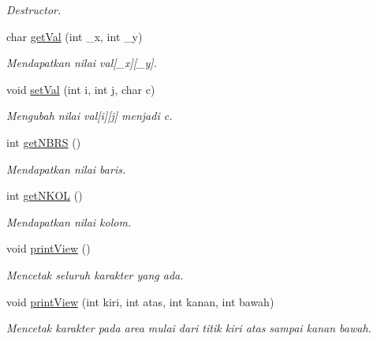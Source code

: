 \begin{DoxyCompactItemize}
\begin{DoxyCompactList}\small\item\em Destructor. \end{DoxyCompactList}\item 
char \hyperlink{classView_aa6bd990eaac4d2991f27b304213b54ef}{get\-Val} (int \-\_\-x, int \-\_\-y)
\begin{DoxyCompactList}\small\item\em Mendapatkan nilai val\mbox{[}\-\_\-x\mbox{]}\mbox{[}\-\_\-y\mbox{]}. \end{DoxyCompactList}\item 
void \hyperlink{classView_a21cba84b1b3374baaec030a21128db47}{set\-Val} (int i, int j, char c)
\begin{DoxyCompactList}\small\item\em Mengubah nilai val\mbox{[}i\mbox{]}\mbox{[}j\mbox{]} menjadi c. \end{DoxyCompactList}\item 
int \hyperlink{classView_a62ae4de313b6643810b989ae988a1640}{get\-N\-B\-R\-S} ()
\begin{DoxyCompactList}\small\item\em Mendapatkan nilai baris. \end{DoxyCompactList}\item 
int \hyperlink{classView_a03b9f87a6e0aada6ddabaa459e261848}{get\-N\-K\-O\-L} ()
\begin{DoxyCompactList}\small\item\em Mendapatkan nilai kolom. \end{DoxyCompactList}\item 
\hypertarget{classView_a769e75520faca6d5bd21d8e4905d4341}{void \hyperlink{classView_a769e75520faca6d5bd21d8e4905d4341}{print\-View} ()}\label{classView_a769e75520faca6d5bd21d8e4905d4341}

\begin{DoxyCompactList}\small\item\em Mencetak seluruh karakter yang ada. \end{DoxyCompactList}\item 
\hypertarget{classView_a228842cd6673f8f436e00bf5f5f649fe}{void \hyperlink{classView_a228842cd6673f8f436e00bf5f5f649fe}{print\-View} (int kiri, int atas, int kanan, int bawah)}\label{classView_a228842cd6673f8f436e00bf5f5f649fe}

\begin{DoxyCompactList}\small\item\em Mencetak karakter pada area mulai dari titik kiri atas sampai kanan bawah. \end{DoxyCompactList}\end{DoxyCompactItemize}


